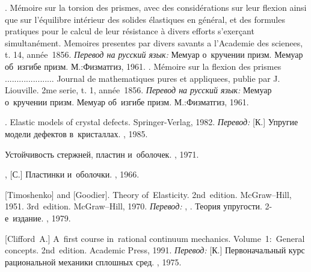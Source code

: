 \begin{thebibliography}{123}
\begin{otherlanguage}{russian}
.
%
Mémoire sur la torsion des prismes, avec des considérations sur leur flexion ainsi que sur l'équilibre intérieur des solides élastiques en général, et des formules pratiques pour le calcul de leur résistance à divers efforts s’exerçant simultanément.
%
Memoires presentes par divers savants a l'Academie des scienees, t. 14, année~1856.
\emph{Перевод на русский язык:}
Мемуар о~кручении призм.
Мемуар об~изгибе призм.
М.:\;Физ\-мат\-гиз, 1961.
%
.
%
Mémoire sur la flexion des prismes .....................
%
Journal de mathematiques pures et appliquees, publie par J. Liouville.
2me serie, t. 1, année~1856.
%
\emph{Перевод на русский язык:}
Мемуар о~кручении призм.
Мемуар об~изгибе призм.
М.:\;Физ\-мат\-гиз, 1961.

.
Elastic models of crystal defects.
Springer\hbox{-}Verlag,
1982.
\emph{Перевод:}
[К.]
Упругие модели дефектов в~кристаллах.
\mirpublisher,
1985.

Устойчивость стержней, пластин и~оболочек.
\naukapublisher, 1971.

,
[С.]
Пластинки и~оболочки.
\naukapublisher, 1966.

[Timoshenko] and [Goodier].
Theory of~Elasticity.
2nd~edition. McGraw\hbox{--}Hill, 1951. 
3rd~edition. McGraw\hbox{--}Hill, 1970. 
\emph{Перевод:}
, .
Теория упругости.
2\hbox{-}е~издание.
\naukapublisher, 1979.

[Clifford~A.]
A~first course in~rational continuum mechanics.
Volume~1:~General concepts.
2nd~edition.
Academic Press,
1991.
%
\emph{Перевод:}
[К.]
Первоначальный курс рациональной механики сплошных сред.
\mirpublisher,
1975.


\end{otherlanguage}
\end{thebibliography}
